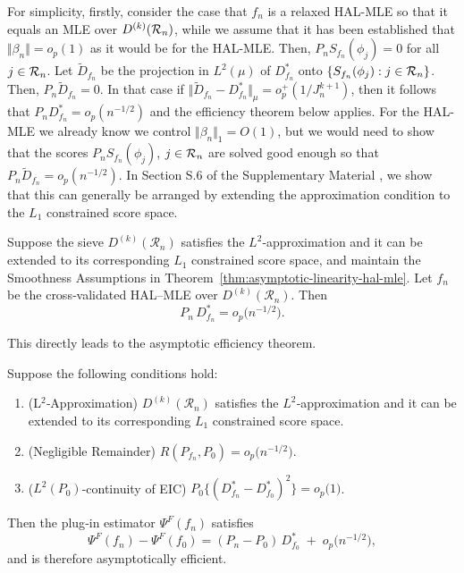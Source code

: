 For simplicity, firstly, consider the case that $f_n$ is a relaxed HAL-MLE so that it equals an MLE over $D^{(k)}({\cal R}_n)$, while we assume that it has been established that $\Vert \beta_n\Vert=o_p(1)$ as it would be for the HAL-MLE. Then, $P_n S_{f_n}(\phi_j)=0$ for all $j\in {\cal R}_n$. Let $\tilde{D}_{f_n}$ be the projection in $L^2(\mu)$ of $D^*_{f_n}$ onto $\{S_{f_n}(\phi_j):j\in {\cal R}_n\}$. Then, $P_n \tilde{D}_{f_n}=0$. In that case if $\Vert \tilde{D}_{f_n}-D^*_{f_n}\Vert_{\mu}=o_p^+(1/J_n^{k+1})$, then it follows that $P_n D^*_{f_n}=o_p(n^{-1/2})$ and the efficiency theorem below  applies. For the HAL-MLE we already know we control $\Vert \beta_n\Vert_1=O(1)$, but we would need to show that the scores $P_n S_{f_n}(\phi_j)$, $j\in {\cal R}_n$ are solved good enough so that $P_n \tilde{D}_{f_n}=o_p(n^{-1/2})$. In Section S.6 of the Supplementary Material \citep{hou2026supplement}, we show that this can generally be arranged by extending the approximation condition to the $L_1$ constrained score space.


\begin{theorem}
\label{thm:Efficient Influence Curve Approximation}
Suppose the sieve \(D^{(k)}(\mathcal R_n)\) satisfies the \(L^2\)‐approximation and it can be extended to its corresponding $L_1$ constrained score space, and maintain the Smoothness Assumptions in Theorem~\ref{thm:asymptotic-linearity-hal-mle}. 
Let \(f_n\) be the cross‐validated HAL–MLE over \(D^{(k)}(\mathcal R_n)\). Then
\[
P_n\,D^*_{f_n}
= o_p\!\bigl(n^{-1/2}\bigr).
\]
\end{theorem}

This directly leads to the asymptotic efficiency theorem. 
\begin{theorem}
\label{thm:plugin_HAL_asymptotic_efficiency}
Suppose the following conditions hold:
\begin{enumerate}
  \item (L\(^2\)‐Approximation) \(D^{(k)}(\mathcal R_n)\) satisfies the \(L^2\)‐approximation and it can be extended to its corresponding $L_1$ constrained score space.
  \item (Negligible Remainder) \(R(P_{f_n},P_0)=o_p\bigl(n^{-1/2}\bigr)\).
  \item (\(L^2(P_0)\)-continuity of EIC) \(P_0\{(D^*_{f_n}-D^*_{f_0})^2\}
      = o_p\bigl(1\bigr)\).
\end{enumerate}
Then the plug‐in estimator \(\Psi^F(f_n)\) satisfies
\[
\Psi^F(f_n) - \Psi^F(f_0)
= (P_n - P_0)\,D^*_{f_0} \;+\; o_p\!\bigl(n^{-1/2}\bigr),
\]
and is therefore asymptotically efficient.
\end{theorem}

